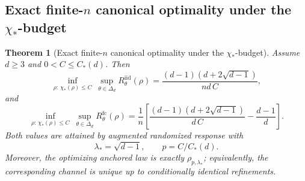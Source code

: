 \documentclass[11pt]{amsart}
\newtheorem{theorem}{Theorem}[section]
\theoremstyle{definition}
\begin{document}
\subsection{Exact finite-\texorpdfstring{$n$}{n} canonical optimality under the \texorpdfstring{$\chi_*$}{chi*}-budget}

\begin{theorem}[Exact finite-$n$ canonical optimality under the $\chi_*$-budget]\label{thm:finite-canonical-chi}
Assume $d\ge 3$ and $0<C\le C_*(d)$. Then
\[
\inf_{\rho:\,\chi_*(\rho)\le C}\ \sup_{\theta\in\Delta_d}R^{\mathrm{iid}}_\theta(\rho)
=
\frac{(d-1)(d+2\sqrt{d-1})}{n d\,C},
\]
and
\[
\inf_{\rho:\,\chi_*(\rho)\le C}\ \sup_{\theta\in\Delta_d}R^{\mathrm{fc}}_\theta(\rho)
=
\frac1n\left[
\frac{(d-1)(d+2\sqrt{d-1})}{d\,C}
-\frac{d-1}{d}
\right].
\]
Both values are attained by augmented randomized response with
\[
\lambda_*=\sqrt{d-1},
\qquad
p=C/C_*(d).
\]
Moreover, the optimizing anchored law is exactly $\rho_{p,\lambda_*}$; equivalently, the corresponding channel is unique up to conditionally identical refinements.
\end{theorem}
\end{document}
